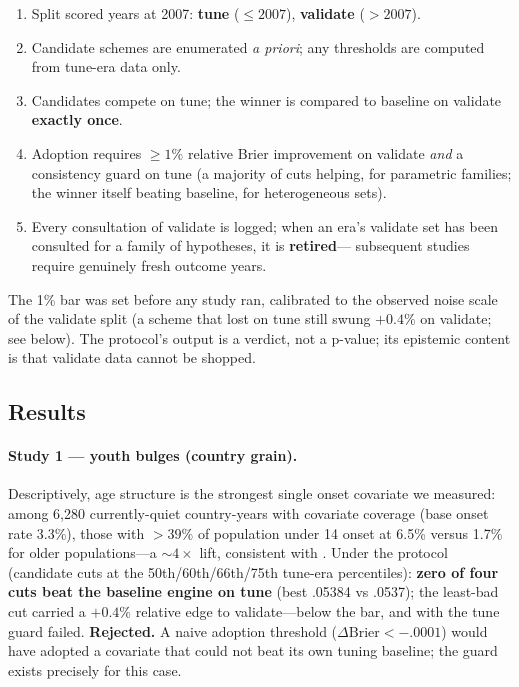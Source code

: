 \documentclass[11pt]{article}
\newcommand{\brier}{\mathrm{Brier}}
\begin{document}
\begin{enumerate}
\item Split scored years at 2007: \textbf{tune} (${\leq}2007$),
\textbf{validate} (${>}2007$).
\item Candidate schemes are enumerated \emph{a priori}; any thresholds are
computed from tune-era data only.
\item Candidates compete on tune; the winner is compared to baseline on
validate \textbf{exactly once}.
\item Adoption requires ${\geq}1\%$ relative Brier improvement on validate
\emph{and} a consistency guard on tune (a majority of cuts helping, for
parametric families; the winner itself beating baseline, for heterogeneous
sets).
\item Every consultation of validate is logged; when an era's validate set
has been consulted for a family of hypotheses, it is \textbf{retired}---
subsequent studies require genuinely fresh outcome years.
\end{enumerate}

The 1\% bar was set before any study ran, calibrated to the observed noise
scale of the validate split (a scheme that lost on tune still swung $+0.4\%$
on validate; see below). The protocol's output is a verdict, not a p-value;
its epistemic content is that validate data cannot be shopped.

\subsection{Results}

\paragraph{Study 1 --- youth bulges (country grain).} Descriptively, age
structure is the strongest single onset covariate we measured: among 6{,}280
currently-quiet country-years with covariate coverage (base onset rate
3.3\%), those with ${>}39\%$ of population under 14 onset at 6.5\% versus
1.7\% for older populations---a ${\sim}4\times$ lift, consistent with
\citet{urdal2006clash}. Under the protocol (candidate cuts at the
50th/60th/66th/75th tune-era percentiles): \textbf{zero of four cuts beat
the baseline engine on tune} (best .05384 vs .0537); the least-bad cut
carried a $+0.4\%$ relative edge to validate---below the bar, and with the
tune guard failed. \textbf{Rejected.} A naive adoption threshold
($\Delta\brier < -.0001$) would have adopted a covariate that could not beat
its own tuning baseline; the guard exists precisely for this case.
\end{document}
